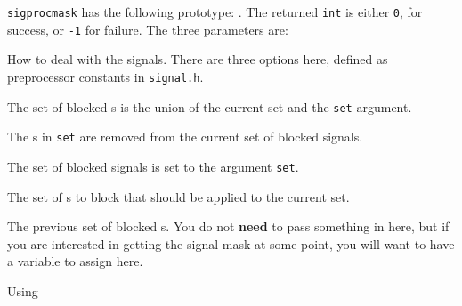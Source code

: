 \texttt{sigprocmask} has the following prototype: .
The returned \texttt{int} is either \texttt{0}, for success, or \texttt{-1} for failure.
The three parameters are:
\begin{description}[noitemsep]
\item[\cinline{how}] How to deal with the signals.
  There are three options here, defined as preprocessor constants in \texttt{signal.h}.
  \begin{description}[noitemsep]
  \item[\cinline{SIG_BLOCK}] The set of blocked s is the union of the current set and the \texttt{set} argument.
  \item[\cinline{SIG_UNBLOCK}] The s in \texttt{set} are removed from the current set of blocked signals.
  \item[\cinline{SIG_SETMASK}] The set of blocked signals is set to the argument \texttt{set}.
  \end{description}
\item[\cinline{*set}] The set of s to block that should be applied to the current set.
\item[\cinline{*oldset}] The previous set of blocked s.
  You do not \textbf{need} to pass something in here, but if you are interested in getting the signal mask at some point, you will want to have a variable to assign here.
\end{description}

\begin{listing}[h!tbp]
\caption{Using }
\label{lst:Using_sigprocmask}
\end{listing}

